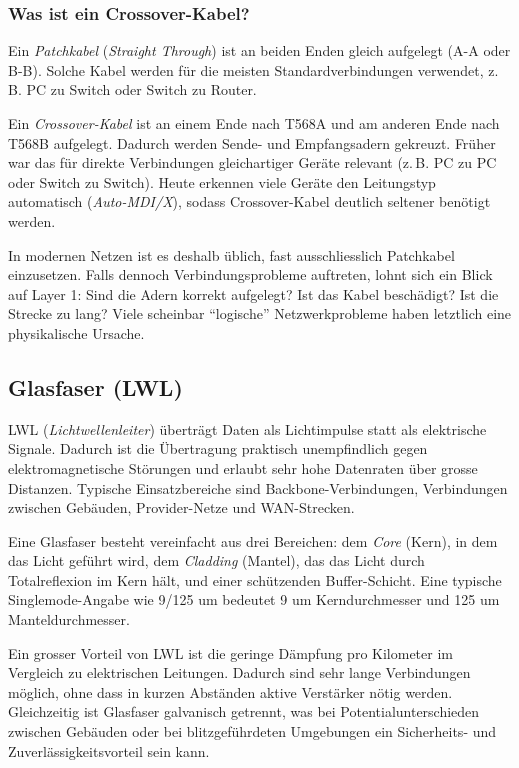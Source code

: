 \documentclass[11pt, oneside, numbers=nönddot]{scrbook}
\begin{document}
\subsubsection{Was ist ein Crossover-Kabel?}
Ein \textit{Patchkabel} (\textit{Straight Through}) ist an beiden Enden gleich aufgelegt (A-A oder B-B). Solche Kabel werden für die meisten Standardverbindungen verwendet, z.\,B. PC zu Switch oder Switch zu Router.

Ein \textit{Crossover-Kabel} ist an einem Ende nach T568A und am anderen Ende nach T568B aufgelegt. Dadurch werden Sende- und Empfangsadern gekreuzt. Früher war das für direkte Verbindungen gleichartiger Geräte relevant (z.\,B. PC zu PC oder Switch zu Switch). Heute erkennen viele Geräte den Leitungstyp automatisch (\textit{Auto-MDI/X}), sodass Crossover-Kabel deutlich seltener benötigt werden.

In modernen Netzen ist es deshalb üblich, fast ausschliesslich Patchkabel einzusetzen. Falls dennoch Verbindungsprobleme auftreten, lohnt sich ein Blick auf Layer 1: Sind die Adern korrekt aufgelegt? Ist das Kabel beschädigt? Ist die Strecke zu lang? Viele scheinbar ``logische'' Netzwerkprobleme haben letztlich eine physikalische Ursache.
\newpage
\subsection{Glasfaser (LWL)}
LWL (\textit{Lichtwellenleiter}) überträgt Daten als Lichtimpulse statt als elektrische Signale. Dadurch ist die Übertragung praktisch unempfindlich gegen elektromagnetische Störungen und erlaubt sehr hohe Datenraten über grosse Distanzen. Typische Einsatzbereiche sind Backbone-Verbindungen, Verbindungen zwischen Gebäuden, Provider-Netze und WAN-Strecken.

Eine Glasfaser besteht vereinfacht aus drei Bereichen: dem \textit{Core} (Kern), in dem das Licht geführt wird, dem \textit{Cladding} (Mantel), das das Licht durch Totalreflexion im Kern hält, und einer schützenden Buffer-Schicht. Eine typische Singlemode-Angabe wie 9/125 um bedeutet 9 um Kerndurchmesser und 125 um Manteldurchmesser.

Ein grosser Vorteil von LWL ist die geringe Dämpfung pro Kilometer im Vergleich zu elektrischen Leitungen. Dadurch sind sehr lange Verbindungen möglich, ohne dass in kurzen Abständen aktive Verstärker nötig werden. Gleichzeitig ist Glasfaser galvanisch getrennt, was bei Potentialunterschieden zwischen Gebäuden oder bei blitzgeführdeten Umgebungen ein Sicherheits- und Zuverlässigkeitsvorteil sein kann.
\end{document}
